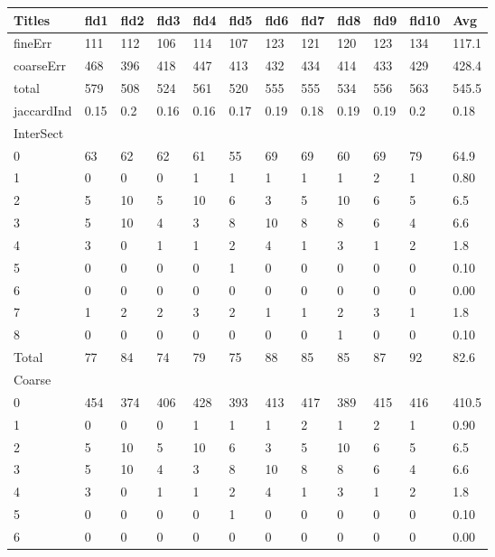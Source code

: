 \documentclass[ms]{nuthesis}
\begin{document}
\FloatBarrier
\begin{table}[h]
  \centering
  \begin{tabular}{|l||l||l||l||l||l||l||l||l||l||l||l|}\toprule
    Titles & fld1 & fld2 & fld3 & fld4 & fld5 & fld6 & fld7 & fld8 & fld9 & fld10 & Avg \\ \midrule
    fineErr & 111 & 112 & 106 & 114 & 107 & 123 & 121 & 120 & 123 & 134 & 117.1 \\
    coarseErr & 468 & 396 & 418 & 447 & 413 & 432 & 434 & 414 & 433 & 429 & 428.4 \\
    total & 579 & 508 & 524 & 561 & 520 & 555 & 555 & 534 & 556 & 563 & 545.5 \\
    jaccardInd & 0.15 & 0.2 & 0.16 & 0.16 & 0.17 & 0.19 & 0.18 & 0.19 & 0.19 & 0.2 & 0.18 \\
    InterSect &  &  &  &  &  &  &  &  &  &  &  \\
    0 & 63 & 62 & 62 & 61 & 55 & 69 & 69 & 60 & 69 & 79 & 64.9 \\
    1 & 0 & 0 & 0 & 1 & 1 & 1 & 1 & 1 & 2 & 1 & 0.80 \\
    2 & 5 & 10 & 5 & 10 & 6 & 3 & 5 & 10 & 6 & 5 & 6.5 \\
    3 & 5 & 10 & 4 & 3 & 8 & 10 & 8 & 8 & 6 & 4 & 6.6 \\
    4 & 3 & 0 & 1 & 1 & 2 & 4 & 1 & 3 & 1 & 2 & 1.8 \\
    5 & 0 & 0 & 0 & 0 & 1 & 0 & 0 & 0 & 0 & 0 & 0.10 \\
    6 & 0 & 0 & 0 & 0 & 0 & 0 & 0 & 0 & 0 & 0 & 0.00 \\
    7 & 1 & 2 & 2 & 3 & 2 & 1 & 1 & 2 & 3 & 1 & 1.8 \\
    8 & 0 & 0 & 0 & 0 & 0 & 0 & 0 & 1 & 0 & 0 & 0.10 \\
    Total & 77 & 84 & 74 & 79 & 75 & 88 & 85 & 85 & 87 & 92 & 82.6 \\
    Coarse &  &  &  &  &  &  &  &  &  &  &  \\
    0 & 454 & 374 & 406 & 428 & 393 & 413 & 417 & 389 & 415 & 416 & 410.5 \\
    1 & 0 & 0 & 0 & 1 & 1 & 1 & 2 & 1 & 2 & 1 & 0.90 \\
    2 & 5 & 10 & 5 & 10 & 6 & 3 & 5 & 10 & 6 & 5 & 6.5 \\
    3 & 5 & 10 & 4 & 3 & 8 & 10 & 8 & 8 & 6 & 4 & 6.6 \\
    4 & 3 & 0 & 1 & 1 & 2 & 4 & 1 & 3 & 1 & 2 & 1.8 \\
    5 & 0 & 0 & 0 & 0 & 1 & 0 & 0 & 0 & 0 & 0 & 0.10 \\
    6 & 0 & 0 & 0 & 0 & 0 & 0 & 0 & 0 & 0 & 0 & 0.00 \\

\end{tabular}
\end{table}
\end{document}
